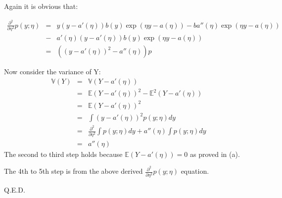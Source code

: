 \begin{answer}

Again it is obvious that:

\begin{eqnarray*}
\frac{\partial^2}{\partial \eta^2} p(y;\eta)
    &=& y(y-a'(\eta)) b(y) \exp(\eta y-a(\eta))-ba''(\eta)\exp(\eta y-a(\eta)) \\
    &-& a'(\eta)(y-a'(\eta))b(y)\exp(\eta y -a(\eta)) \\
    &=& ((y-a'(\eta))^2-a''(\eta))p
\end{eqnarray*}

Now consider the variance of Y:
\begin{eqnarray*}
\mathbb{V}(Y)
    &=& \mathbb{V}(Y-a'(\eta)) \\
    &=& \mathbb{E}(Y-a'(\eta))^2 - \mathbb{E}^2(Y-a'(\eta)) \\
    &=& \mathbb{E}(Y-a'(\eta))^2 \\
    &=& \int (y-a'(\eta))^2 p(y;\eta)dy \\
    &=& \frac{\partial^2}{\partial \eta^2} \int p(y;\eta)dy + a''(\eta) \int p(y;\eta)dy \\
    &=& a''(\eta)
\end{eqnarray*}
The second to third step holds because $\mathbb{E}(Y-a'(\eta)) = 0$ as proved in (a).

The 4th to 5th step is from the above derived $\frac{\partial^2}{\partial \eta^2} p(y;\eta)$ equation.

Q.E.D.

\end{answer}

